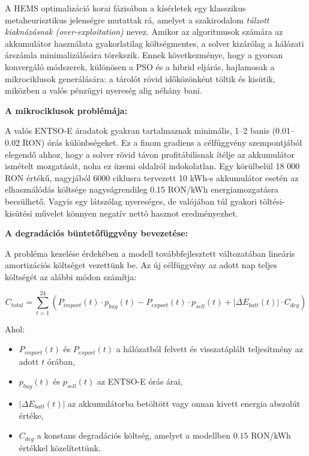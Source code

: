 A HEMS optimalizáció korai fázisában a kísérletek egy klasszikus metaheurisztikus jelenségre mutattak rá, amelyet a szakirodalom \textit{túlzott kiaknázásnak (over-exploitation)} nevez. Amikor az algoritmusok számára az akkumulátor használata gyakorlatilag költségmentes, a solver kizárólag a hálózati árszámla minimalizálására törekszik. Ennek következménye, hogy a gyorsan konvergáló módszerek, különösen a PSO és a hibrid eljárás, hajlamosak a mikrociklusok generálására: a tárolót rövid időközönként töltik és kisütik, miközben a valós pénzügyi nyereség alig néhány bani.

\textbf{A mikrociklusok problémája:}

A valós ENTSO-E áradatok gyakran tartalmaznak minimális, 1--2 banis (0.01--0.02 RON) órás különbségeket. Ez a finom gradiens a célfüggvény szempontjából elegendő ahhoz, hogy a solver rövid távon profitábilisnak ítélje az akkumulátor ismételt mozgatását, noha ez üzemi oldalról indokolatlan. Egy körülbelül 18 000 RON értékű, nagyjából 6000 ciklusra tervezett 10 kWh-s akkumulátor esetén az elhasználódás költsége nagyságrendileg 0.15 RON/kWh energiamozgatásra becsülhető. Vagyis egy látszólag nyereséges, de valójában túl gyakori töltési-kisütési művelet könnyen negatív nettó hasznot eredményezhet.

\textbf{A degradációs büntetőfüggvény bevezetése:}

A probléma kezelése érdekében a modell továbbfejlesztett változatában lineáris amortizációs költséget vezettünk be. Az új célfüggvény az adott nap teljes költségét az alábbi módon számítja:

\begin{equation}
C_{total} = \sum_{t=1}^{24} \left( P_{import}(t) \cdot p_{buy}(t) - P_{export}(t) \cdot p_{sell}(t) + \left| \Delta E_{batt}(t) \right| \cdot C_{deg} \right)
\end{equation}

Ahol:
\begin{itemize}
	\item $P_{import}(t)$ és $P_{export}(t)$ a hálózatból felvett és visszatáplált teljesítmény az adott $t$ órában,
	\item $p_{buy}(t)$ és $p_{sell}(t)$ az ENTSO-E órás árai,
	\item $\left| \Delta E_{batt}(t) \right|$ az akkumulátorba betöltött vagy onnan kivett energia abszolút értéke,
	\item $C_{deg}$ a konstans degradációs költség, amelyet a modellben $0.15$ RON/kWh értékkel közelítettünk.
\end{itemize}

